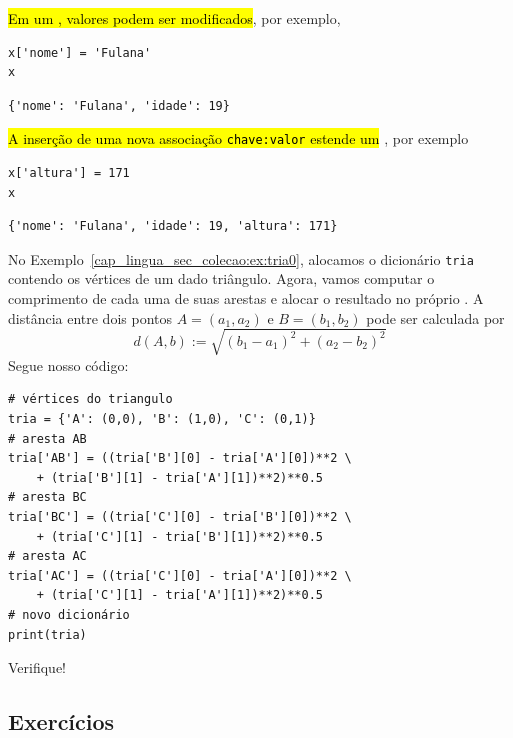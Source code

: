 \hl{Em um {\PYTHONdict}, valores podem ser modificados}, por exemplo,

\begin{lstlisting}
x['nome'] = 'Fulana'
x
\end{lstlisting}

\begin{verbatim}
{'nome': 'Fulana', 'idade': 19}
\end{verbatim}

\hl{A inserção de uma nova associação \texttt{chave:valor} estende um {\PYTHONdict}}, por exemplo

\begin{lstlisting}
x['altura'] = 171
x
\end{lstlisting}

\begin{verbatim}
{'nome': 'Fulana', 'idade': 19, 'altura': 171}
\end{verbatim}

\begin{ex}
  No Exemplo~\ref{cap_lingua_sec_colecao:ex:tria0}, alocamos o dicionário \texttt{tria} contendo os vértices de um dado triângulo. Agora, vamos computar o comprimento de cada uma de suas arestas e alocar o resultado no próprio {\PYTHONdict}. A distância entre dois pontos $A = (a_1, a_2)$ e $B = (b_1, b_2)$ pode ser calculada por
  \begin{equation}
    d(A, b) := \sqrt{(b_1-a_1)^2 + (a_2-b_2)^2}
  \end{equation}
  Segue nosso código:

\begin{lstlisting}
# vértices do triangulo
tria = {'A': (0,0), 'B': (1,0), 'C': (0,1)}
# aresta AB
tria['AB'] = ((tria['B'][0] - tria['A'][0])**2 \
    + (tria['B'][1] - tria['A'][1])**2)**0.5
# aresta BC
tria['BC'] = ((tria['C'][0] - tria['B'][0])**2 \
    + (tria['C'][1] - tria['B'][1])**2)**0.5
# aresta AC
tria['AC'] = ((tria['C'][0] - tria['A'][0])**2 \
    + (tria['C'][1] - tria['A'][1])**2)**0.5
# novo dicionário
print(tria)
\end{lstlisting}

Verifique!

\end{ex}

\subsection{Exercícios}


